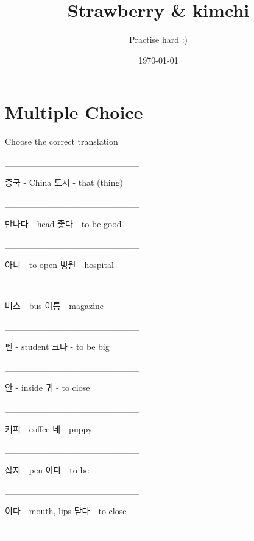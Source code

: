 \documentclass[addpoints, 30pt]{../exam}%
\title{Strawberry \& kimchi}%
\author{Practise hard :)}%
\date{\today}%
\begin{document}
%
\normalsize%
\maketitle%
\section{Multiple Choice}%
Choose the correct translation%
\begin{questions}%
\question[1]%
\_\_\_\_\_\_\_\_\_\_\_\_\_\_\_\_\_\_\_\_\_%
\begin{choices}%
\CorrectChoice%
중국 {-} China%
\choice%
도시 {-} that (thing)%
\end{choices}%
\question[1]%
\_\_\_\_\_\_\_\_\_\_\_\_\_\_\_\_\_\_\_\_\_%
\begin{choices}%
\choice%
만나다 {-} head%
\CorrectChoice%
좋다 {-} to be good%
\end{choices}%
\question[1]%
\_\_\_\_\_\_\_\_\_\_\_\_\_\_\_\_\_\_\_\_\_%
\begin{choices}%
\choice%
아니 {-} to open%
\CorrectChoice%
병원 {-} hospital%
\end{choices}%
\question[1]%
\_\_\_\_\_\_\_\_\_\_\_\_\_\_\_\_\_\_\_\_\_%
\begin{choices}%
\CorrectChoice%
버스 {-} bus%
\choice%
이름 {-} magazine%
\end{choices}%
\question[1]%
\_\_\_\_\_\_\_\_\_\_\_\_\_\_\_\_\_\_\_\_\_%
\begin{choices}%
\choice%
펜 {-} student%
\CorrectChoice%
크다 {-} to be big%
\end{choices}%
\question[1]%
\_\_\_\_\_\_\_\_\_\_\_\_\_\_\_\_\_\_\_\_\_%
\begin{choices}%
\CorrectChoice%
안 {-} inside%
\choice%
귀 {-} to close%
\end{choices}%
\question[1]%
\_\_\_\_\_\_\_\_\_\_\_\_\_\_\_\_\_\_\_\_\_%
\begin{choices}%
\CorrectChoice%
커피 {-} coffee%
\choice%
네 {-} puppy%
\end{choices}%
\question[1]%
\_\_\_\_\_\_\_\_\_\_\_\_\_\_\_\_\_\_\_\_\_%
\begin{choices}%
\choice%
잡지 {-} pen%
\CorrectChoice%
이다 {-} to be%
\end{choices}%
\question[1]%
\_\_\_\_\_\_\_\_\_\_\_\_\_\_\_\_\_\_\_\_\_%
\begin{choices}%
\choice%
이다 {-} mouth, lips%
\CorrectChoice%
닫다 {-} to close%
\end{choices}%
\question[1]%
\_\_\_\_\_\_\_\_\_\_\_\_\_\_\_\_\_\_\_\_\_%
\begin{choices}%

\end{choices}
\end{questions}
\end{document}
